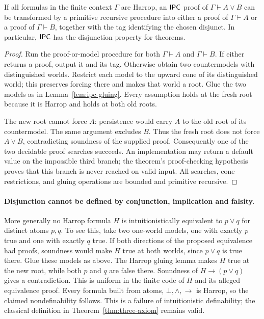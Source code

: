 \begin{theorem}
\label{thm:ipc-disjunction}
If all formulas in the finite context $\Gamma$ are Harrop, an $\mathsf{IPC}$ proof
of $\Gamma\vdash A\vee B$ can be transformed by a primitive recursive
procedure into either a proof of $\Gamma\vdash A$ or a proof of
$\Gamma\vdash B$, together with the tag identifying the chosen disjunct.
In particular, $\mathsf{IPC}$ has the disjunction property for theorems.
\end{theorem}
\begin{proof}
Run the proof-or-model procedure for both $\Gamma\vdash A$ and
$\Gamma\vdash B$. If either returns a proof, output it and its tag.
Otherwise obtain two countermodels with distinguished worlds. Restrict
each model to the upward cone of its distinguished world; this preserves
forcing there and makes that world a root. Glue the two models as in
Lemma~\ref{lem:ipc-gluing}. Every assumption holds at the fresh root because
it is Harrop and holds at both old roots.

The new root cannot force $A$: persistence would carry $A$ to the old root
of its countermodel. The same argument excludes $B$. Thus the fresh root
does not force $A\vee B$, contradicting soundness of the supplied proof.
Consequently one of the two decidable proof searches succeeds. An
implementation may return a default value on the impossible third branch;
the theorem's proof-checking hypothesis proves that this branch is never
reached on valid input. All searches, cone restrictions, and gluing
operations are bounded and primitive recursive.
\end{proof}

\paragraph{Disjunction cannot be defined by conjunction, implication and falsity.}
More generally no Harrop formula $H$ is intuitionistically equivalent to
$p\vee q$ for distinct atoms $p,q$. To see this, take two one-world models,
one with exactly $p$ true and one with exactly $q$ true. If both directions
of the proposed equivalence had proofs, soundness would make $H$ true at
both worlds, since $p\vee q$ is true there. Glue these models as above.
The Harrop gluing lemma makes $H$ true at the new root, while both $p$ and
$q$ are false there. Soundness of $H\to(p\vee q)$ gives a contradiction.
This is uniform in the finite code of $H$ and its alleged equivalence
proof. Every formula built from atoms, $\bot,\wedge,\to$ is Harrop, so the
claimed nondefinability follows. This is a failure of intuitionistic
definability; the classical definition in Theorem~\ref{thm:three-axiom}
remains valid.

